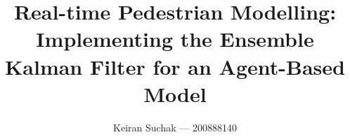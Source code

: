 \documentclass[12pt, twoside, a4paper]{report}
\begin{document}
\title{Real-time Pedestrian Modelling: Implementing the Ensemble Kalman Filter
for an Agent-Based Model}
\author{Keiran Suchak --- 200888140}
\maketitle


\tableofcontents
\listoffigures
\listoftables















\begin{appendix}
    
\end{appendix}



\end{document}
